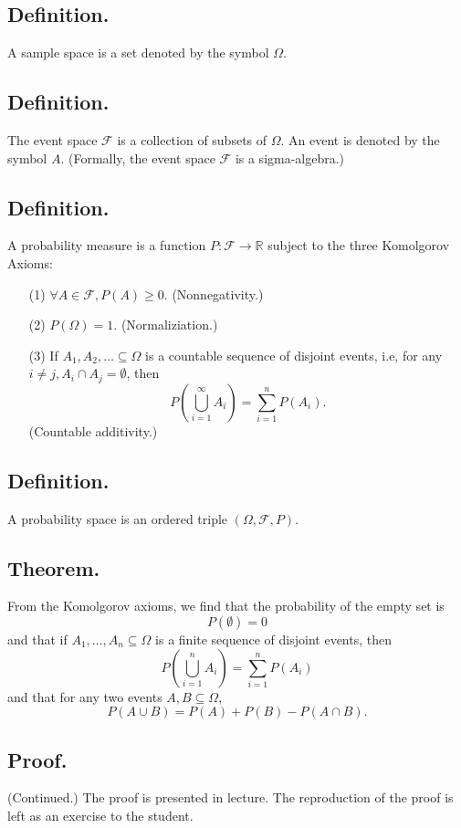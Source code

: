 \documentclass[titlepage]{article}
\begin{document}
\subsection{Definition.} A sample space is a set denoted by the symbol $\Omega$.

\subsection{Definition.} The event space $\mathcal{F}$ is a collection of subsets of $\Omega$. An event is denoted by the symbol $A$. (Formally, the event space $\mathcal{F}$ is a sigma-algebra.)

\subsection{Definition.} A probability measure is a function $P: \mathcal{F} \to \mathbb{R}$ subject to the three Komolgorov Axioms:
\begin{enumerate}
\item[(1)] $\forall A \in \mathcal{F}, P(A) \geq 0.$ (Nonnegativity.)
\item[(2)] $P(\Omega) = 1.$ (Normaliziation.)
\item[(3)] If $A_{1}, A_{2}, \ldots \subseteq \Omega$ is a countable sequence of disjoint events, i.e, for any $i \neq j, A_{i} \cap A_{j} = \emptyset$, then 
$$P\left(\bigcup_{i=1}^{\infty}A_{i}\right) = \sum_{i=1}^{n}P(A_{i}).$$
(Countable additivity.)
\end{enumerate}

\subsection{Definition.} A probability space is an ordered triple $(\Omega, \mathcal{F}, P)$.

\subsection{Theorem.} From the Komolgorov axioms, we find 
that the probability of the empty set is 
$$P(\emptyset) = 0$$
and that if $A_{1}, \ldots, A_{n} \subseteq \Omega$ is a finite sequence of disjoint events, then 
$$P\left(\bigcup_{i=1}^{n}A_{i}\right) = \sum_{i=1}^{n}P(A_{i})$$
and that for any two events $A, B \subseteq \Omega$, 
$$P(A \cup B) = P(A) + P(B) - P(A \cap B).$$

\subsection{Proof.} (Continued.) The proof is presented in lecture. The reproduction of the proof is left as an exercise to the student.
\end{document}
